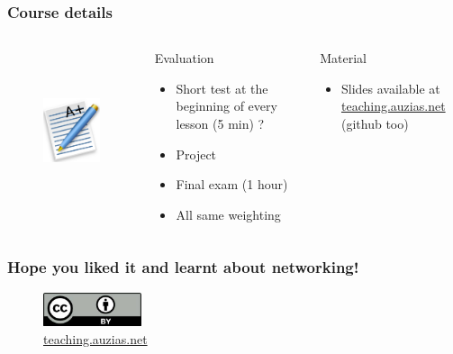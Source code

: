 \documentclass[]{beamer}
\begin{document}
  \begin{frame}
    \frametitle{Course details}
    \begin{columns}
        \begin{figure}[t]
          \centering
          \includegraphics[height=4cm]{./imgs/grade.pdf}
          \label{fig:marks}
        \end{figure}
        \begin{block}{Evaluation}
          \begin{itemize}
            \item Short test at the beginning of every lesson (5 min) ?
            \item Project
            \item Final exam (1 hour)
            \item All same weighting
          \end{itemize}
        \end{block}
        \begin{block}{Material}
          \begin{itemize}
            \item Slides available at \color{blue}\href{http://teaching.auzias.net}{teaching.auzias.net} \color{black} (github too)
          \end{itemize}
        \end{block}
    \end{columns}
  \end{frame}









%    

\begin{frame}
    \frametitle{Hope you liked it and learnt about networking!}
  \begin{figure}[p]
      \centering
      \includegraphics[height=1cm]{./imgs/cc40.jpg}
      \caption{\color{blue}\href{http://teaching.auzias.net}{teaching.auzias.net}}
    \label{fig:cc40}
  \end{figure}
\end{frame}
\end{document}
